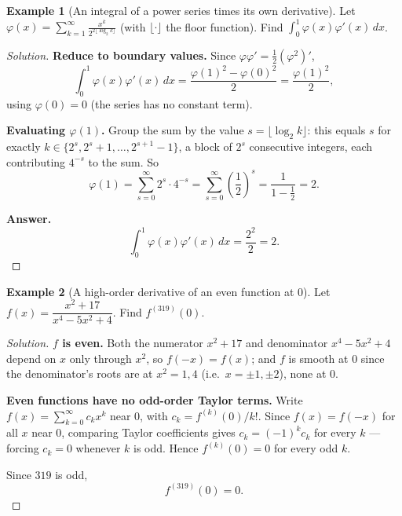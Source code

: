 \documentclass[11pt]{article}
\theoremstyle{definition}
\newtheorem{example}{Example}[section]
\begin{document}
\begin{example}[An integral of a power series times its own derivative]
Let $\varphi(x)=\displaystyle\sum_{k=1}^\infty\frac{x^k}{2^{2\lfloor\log_2k\rfloor}}$ (with $\lfloor\cdot\rfloor$ the floor function). Find $\displaystyle\int_0^1\varphi(x)\varphi'(x)\,dx$.
\end{example}
\begin{proof}[Solution]
\textbf{Reduce to boundary values.} Since $\varphi\varphi'=\tfrac12(\varphi^2)'$,
\[
\int_0^1\varphi(x)\varphi'(x)\,dx=\frac{\varphi(1)^2-\varphi(0)^2}2=\frac{\varphi(1)^2}2,
\]
using $\varphi(0)=0$ (the series has no constant term).

\textbf{Evaluating $\varphi(1)$.} Group the sum by the value $s=\lfloor\log_2k\rfloor$: this equals $s$ for exactly $k\in\{2^s,2^s+1,\dots,2^{s+1}-1\}$, a block of $2^s$ consecutive integers, each contributing $4^{-s}$ to the sum. So
\[
\varphi(1)=\sum_{s=0}^\infty2^s\cdot4^{-s}=\sum_{s=0}^\infty\left(\frac12\right)^s=\frac1{1-\frac12}=2.
\]

\textbf{Answer.}
\[
\int_0^1\varphi(x)\varphi'(x)\,dx=\frac{2^2}2=\boxed{2}.
\]
\end{proof}

\begin{example}[A high-order derivative of an even function at $0$]
Let $f(x)=\dfrac{x^2+17}{x^4-5x^2+4}$. Find $f^{(319)}(0)$.
\end{example}
\begin{proof}[Solution]
\textbf{$f$ is even.} Both the numerator $x^2+17$ and denominator $x^4-5x^2+4$ depend on $x$ only through $x^2$, so $f(-x)=f(x)$; and $f$ is smooth at $0$ since the denominator's roots are at $x^2=1,4$ (i.e.\ $x=\pm1,\pm2$), none at $0$.

\textbf{Even functions have no odd-order Taylor terms.} Write $f(x)=\sum_{k=0}^\infty c_kx^k$ near $0$, with $c_k=f^{(k)}(0)/k!$. Since $f(x)=f(-x)$ for all $x$ near $0$, comparing Taylor coefficients gives $c_k=(-1)^kc_k$ for every $k$ — forcing $c_k=0$ whenever $k$ is odd. Hence $f^{(k)}(0)=0$ for every odd $k$.

Since $319$ is odd,
\[
\boxed{f^{(319)}(0)=0}.
\]
\end{proof}
\end{document}
